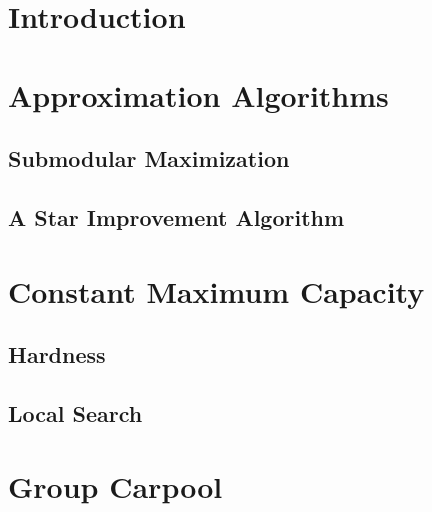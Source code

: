 \begin{abstract}

\end{abstract}

\section{Introduction}


\section{Approximation Algorithms}
\label{sec:approx}


\subsection{Submodular Maximization}
\label{sec:sub}


   \subsection{A Star Improvement Algorithm}
   \label{sec:improve}
   

\section{Constant Maximum Capacity}
\label{sec:cmax}


   \subsection{Hardness}
   \label{sec:hardness}
   

   \subsection{Local Search}
   \label{sec:local}
   

\section{Group Carpool}
\label{sec:group}


